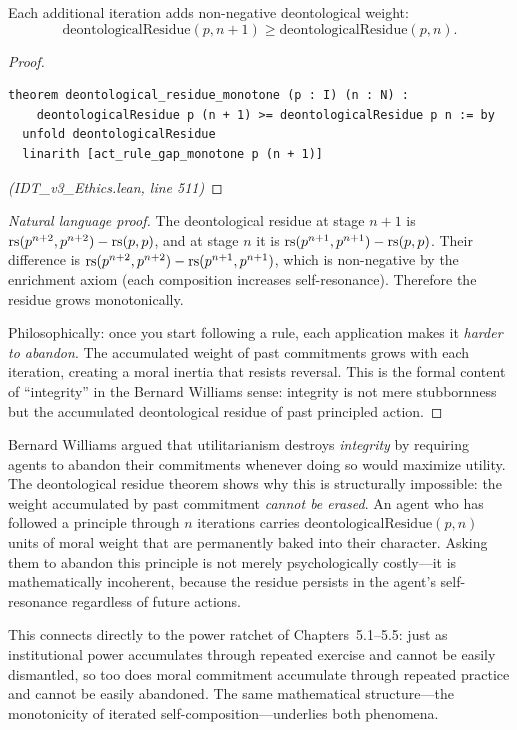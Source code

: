 \begin{theorem}
\label{thm:residue-monotone}
Each additional iteration adds non-negative deontological weight:
\[
  \mathrm{deontologicalResidue}(p, n+1) \geq \mathrm{deontologicalResidue}(p, n).
\]
\end{theorem}

\begin{proof}
\begin{lstlisting}
theorem deontological_residue_monotone (p : I) (n : N) :
    deontologicalResidue p (n + 1) >= deontologicalResidue p n := by
  unfold deontologicalResidue
  linarith [act_rule_gap_monotone p (n + 1)]
\end{lstlisting}
\textit{(IDT\_v3\_Ethics.lean, line 511)}
\end{proof}

\begin{proof}[Natural language proof]
The deontological residue at stage $n+1$ is $\mathrm{rs}(p^{n+2}, p^{n+2}) -
\mathrm{rs}(p, p)$, and at stage $n$ it is $\mathrm{rs}(p^{n+1}, p^{n+1}) - \mathrm{rs}(p, p)$.
Their difference is $\mathrm{rs}(p^{n+2}, p^{n+2}) - \mathrm{rs}(p^{n+1}, p^{n+1})$,
which is non-negative by the enrichment axiom (each composition increases
self-resonance). Therefore the residue grows monotonically.

Philosophically: once you start following a rule, each application makes
it \emph{harder to abandon}. The accumulated weight of past commitments
grows with each iteration, creating a moral inertia that resists reversal.
This is the formal content of ``integrity'' in the Bernard Williams sense:
integrity is not mere stubbornness but the accumulated deontological residue
of past principled action.
\end{proof}

\begin{interpretation}
Bernard Williams argued that utilitarianism destroys \emph{integrity} by
requiring agents to abandon their commitments whenever doing so would
maximize utility. The deontological residue theorem shows why this is
structurally impossible: the weight accumulated by past commitment
\emph{cannot be erased}. An agent who has followed a principle through $n$
iterations carries $\mathrm{deontologicalResidue}(p, n)$ units of moral
weight that are permanently baked into their character. Asking them to
abandon this principle is not merely psychologically costly---it is
mathematically incoherent, because the residue persists in the agent's
self-resonance regardless of future actions.

This connects directly to the power ratchet of Chapters~5.1--5.5: just
as institutional power accumulates through repeated exercise and cannot
be easily dismantled, so too does moral commitment accumulate through
repeated practice and cannot be easily abandoned. The same mathematical
structure---the monotonicity of iterated self-composition---underlies
both phenomena.
\end{interpretation}

